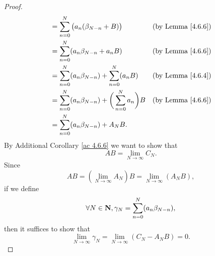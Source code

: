 \begin{proof}
\begin{align*}
                              & = \sum_{n = 0}^N \big(a_n (\beta_{N - n} + B)\big)                      & \text{(by Lemma \ref{4.6.6})} \\
                              & = \sum_{n = 0}^N (a_n \beta_{N - n} + a_n B)                            & \text{(by Lemma \ref{4.6.6})} \\
                              & = \sum_{n = 0}^N (a_n \beta_{N - n}) + \sum_{n = 0}^N (a_n B)           & \text{(by Lemma \ref{4.6.4})} \\
                              & = \sum_{n = 0}^N (a_n \beta_{N - n}) + \bigg(\sum_{n = 0}^N a_n\bigg) B & \text{(by Lemma \ref{4.6.6})} \\
                              & = \sum_{n = 0}^N (a_n \beta_{N - n}) + A_N B.
    \end{align*}
    By Additional Corollary \ref{ac 4.6.6} we want to show that
    \[
        AB = \lim_{N \to \infty} C_N.
    \]
    Since
    \[
        AB = (\lim_{N \to \infty} A_N) B = \lim_{N \to \infty} (A_N B),
    \]
    if we define
    \[
        \forall N \in \mathbf{N}, \gamma_N = \sum_{n = 0}^N (a_n \beta_{N - n}),
    \]
    then it suffices to show that
    \[
        \lim_{N \to \infty} \gamma_N = \lim_{N \to \infty} (C_N - A_N B) = 0.
    \]


\end{proof}
